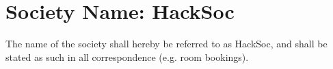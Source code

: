 \section{Society Name: HackSoc}
\begin{clause}
  The name of the society shall hereby be referred to as HackSoc, and shall be stated as such in all correspondence (e.g. room bookings).
\end{clause}
  